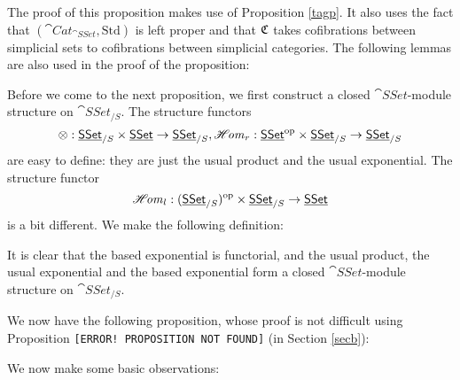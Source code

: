 The proof of this proposition makes use of Proposition \ref{tagp}.
It also uses the fact that $(\cat{Cat}_{\cat{SSet}},\text{Std})$ is left proper and that
$\mathfrak{C}$ takes cofibrations between simplicial sets to cofibrations between simplicial categories.
The following lemmas are also used in the proof of the proposition:



Before we come to the next proposition, we first construct a closed $\cat{SSet}$-module structure on $\cat{SSet}_{/S}$. 
The structure functors $$\otimes:\underline{\smash{\mathsf{SSet}}}_{/S}\times\underline{\smash{\mathsf{SSet}}}\to\underline{\smash{\mathsf{SSet}}}_{/S},\operatorname{\mathscr{H}\mkern-3mu\mathit{om}}_r:\underline{\smash{\mathsf{SSet}}}^{\mathrm{op}}\times\underline{\smash{\mathsf{SSet}}}_{/S}\to\underline{\smash{\mathsf{SSet}}}_{/S}$$
are easy to define: they are just the usual product and the usual exponential. The structure functor
$$\operatorname{\mathscr{H}\mkern-3mu\mathit{om}}_l:(\underline{\smash{\mathsf{SSet}}}_{/S})^{\mathrm{op}}\times\underline{\smash{\mathsf{SSet}}}_{/S}\to\underline{\smash{\mathsf{SSet}}}$$ is a bit different. We make the following definition:


It is clear that the based exponential is functorial, and the usual product, the usual exponential and the based exponential
form a closed $\cat{SSet}$-module structure on $\cat{SSet}_{/S}$. 

We now have the following proposition, whose proof is not difficult using Proposition 
{\color{FF0000}\texttt{[ERROR! PROPOSITION NOT FOUND]}} (in Section \ref{secb}):


We now make some basic observations:


